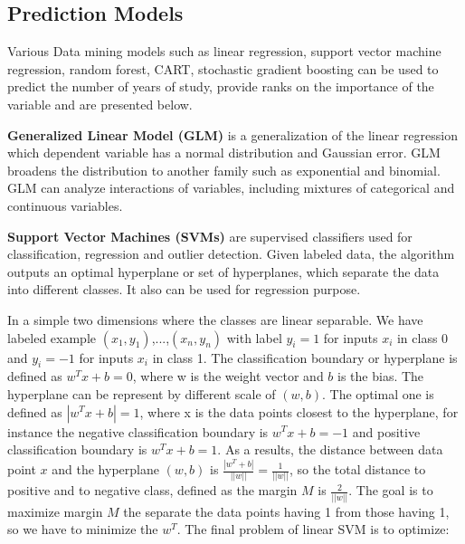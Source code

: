 \documentclass[12pt,english]{report}
\begin{document}
\subsection{Prediction Models}
Various Data mining models such as linear regression, support vector machine regression, random forest, CART, stochastic gradient boosting can be used to predict the number of years of study, provide ranks on the importance of the variable and are presented below.

\vspace{0.15in}
\noindent \textbf{Generalized Linear Model (GLM)} is a generalization of the linear regression which dependent variable has a normal distribution and Gaussian error. GLM broadens the distribution to another family such as exponential and binomial. GLM can analyze interactions of variables, including mixtures of categorical and continuous variables.

\vspace{0.15in}
\noindent \textbf{Support Vector Machines (SVMs)} are supervised classifiers used for classification, regression and outlier detection. Given labeled data, the algorithm outputs an optimal hyperplane or set of hyperplanes, which separate the data into different classes. It also can be used for regression purpose.

In a simple two dimensions where the classes are linear separable. We have labeled example $(x_1,y_1)$,...,$(x_n, y_n)$ with label $y_i = 1$ for inputs $x_i$ in class 0 and $y_i = -1$ for inputs $x_i$ in class 1. The classification boundary or hyperplane is defined as $w^T x +b = 0$, where w is the weight vector and $b$ is the bias. The hyperplane can be represent by different scale of $(w,b)$. The optimal one is defined as $|w^T x +b | = 1$, where x is the data points closest to the hyperplane, for instance the negative classification boundary is $w^T x +b = -1$ and positive classification boundary is $w^T x +b  = 1$. As a results, the distance between data point $x$ and the hyperplane $(w,b)$ is $ \frac{|w^T+b|}{||w||}= \frac{1}{||w||}$, so the total distance to positive and to negative class, defined as the margin $M$ is $\frac{2}{||w||}$.  The goal is to maximize margin $M$ the separate the data points having 1 from those having 1, so we have to minimize the $w^T$. The final problem of linear SVM is to optimize:
\end{document}
